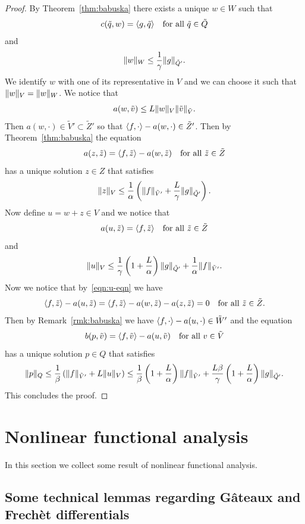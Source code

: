 \documentclass[a4paper,10pt,oneside]{amsbook}
\numberwithin{section}{chapter}
\numberwithin{equation}{chapter}
\theoremstyle{definition}
\DeclarePairedDelimiter{\norm}{\lVert}{\rVert}
\DeclarePairedDelimiter{\dual}{\langle}{\rangle}
\begin{document}
\begin{proof}
By Theorem~\ref{thm:babuska} there exists a unique $w\in W$ such that
\[
c(\tilde q,w)=\dual{g,\tilde q}\quad\text{for all $\tilde q\in\tilde Q$}
\]
and
\[
\norm{w}_W\le\frac{1}{\gamma}\norm{g}_{\tilde Q'}.
\]
We identify $w$ with one of its representative in $V$ and we can choose it such that $\norm{w}_V=\norm{w}_W$. We notice that
\[
a(w,\tilde v)\le L\norm{w}_V\norm{\tilde v}_{\tilde V}.
\]
Then $a(w,\cdot)\in\tilde V'\subset\tilde Z'$ so that $\dual{f,\cdot}-a(w,\cdot)\in\tilde Z'$. Then by Theorem~\ref{thm:babuska} the equation
\[
a(z,\tilde z)=\dual{f,\tilde z}-a(w,\tilde z)\quad\text{for all $\tilde z\in\tilde Z$}
\]
has a unique solution $z\in Z$ that satisfies
\[
\norm{z}_V\le\frac{1}{\alpha}\left(\norm{f}_{\tilde V'}+\frac{L}{\gamma}\norm{g}_{\tilde Q'}\right).
\]
Now define $u=w+z\in V$ and we notice that
\begin{equation}
\label{eqn:u-eqn}
a(u,\tilde z)=\dual{f,\tilde z}\quad\text{for all $\tilde z\in\tilde Z$}
\end{equation}
and
\[
\norm{u}_V\le\frac{1}{\gamma}\left(1+\frac{L}{\alpha}\right)\norm{g}_{\tilde Q'}+\frac{1}{\alpha}\norm{f}_{\tilde V'}.
\]
Now we notice that by~\eqref{eqn:u-eqn} we have
\[
\dual{f,\tilde z}-a(u,\tilde z)=\dual{f,\tilde z}-a(w,\tilde z)-a(z,\tilde z)=0\quad\text{for all $\tilde z\in\tilde Z$}.
\]
Then by Remark~\ref{rmk:babuska} we have $\dual{f,\cdot}-a(u,\cdot)\in\tilde{W}'$ and the equation
\[
b(p,\tilde v)=\dual{f,\tilde v}-a(u,\tilde v)\quad\text{for all $v\in\tilde V$}
\]
has a unique solution $p\in Q$ that satisfies
\[
\norm{p}_Q\le\frac{1}{\beta}\left(\norm{f}_{\tilde V'}+L\norm{u}_V\right)\le\frac{1}{\beta}\left(1+\frac{L}{\alpha}\right)\norm{f}_{\tilde V'}+\frac{L\beta}{\gamma}\left(1+\frac{L}{\alpha}\right)\norm{g}_{\tilde Q'}.
\]
This concludes the proof.
\end{proof}

\section{Nonlinear functional analysis}

In this section we collect some result of nonlinear functional analysis.

\subsection{Some technical lemmas regarding G\^ateaux and Frechèt differentials}
\end{document}
